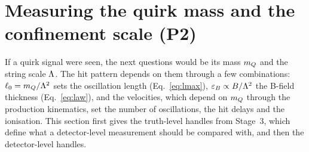 \section{Measuring the quirk mass and the confinement scale (P2)}\label{sec:mlam}

If a quirk signal were seen, the next questions would be its mass $m_Q$ and the string scale $\Lambda$. The hit pattern
depends on them through a few combinations: $\ell_0=m_Q/\Lambda^2$ sets the oscillation length (Eq.~\eqref{eq:lmax}),
$\varepsilon_B\propto B/\Lambda^2$ the B-field thickness (Eq.~\eqref{eq:law}), and the velocities, which depend on $m_Q$ through the
production kinematics, set the number of oscillations, the hit delays and the ionisation. This section first gives the
truth-level handles from Stage~3, which define what a detector-level measurement should be compared with, and then the
detector-level handles.

